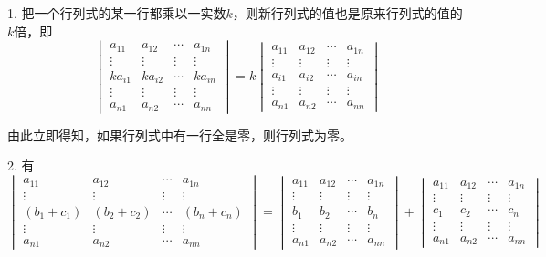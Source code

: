   1. 把一个行列式的某一行都乘以一实数$k$，则新行列式的值也是原来行列式的值的$k$倍，即
\[
  \begin{vmatrix}
    a_{11} & a_{12} & \cdots & a_{1n} \\
    \vdots & \vdots & \vdots & \vdots \\
    ka_{i1} & ka_{i2} & \cdots & ka_{in} \\
    \vdots & \vdots & \vdots & \vdots \\
    a_{n1} & a_{n2} & \cdots & a_{nn}
  \end{vmatrix}
  = k
  \begin{vmatrix}
    a_{11} & a_{12} & \cdots & a_{1n} \\
    \vdots & \vdots & \vdots & \vdots \\
    a_{i1} & a_{i2} & \cdots & a_{in} \\
    \vdots & \vdots & \vdots & \vdots \\
    a_{n1} & a_{n2} & \cdots & a_{nn}
  \end{vmatrix}
  \]

  由此立即得知，如果行列式中有一行全是零，则行列式为零。

  2. 有
  \[
  \begin{vmatrix}
    a_{11} & a_{12} & \cdots & a_{1n} \\
    \vdots & \vdots & \vdots & \vdots \\
    (b_1+c_1) & (b_2+c_2) & \cdots & (b_n+c_n) \\
    \vdots & \vdots & \vdots & \vdots \\
    a_{n1} & a_{n2} & \cdots & a_{nn}
  \end{vmatrix}
  =
  \begin{vmatrix}
    a_{11} & a_{12} & \cdots & a_{1n} \\
    \vdots & \vdots & \vdots & \vdots \\
    b_1 & b_2 & \cdots & b_n \\
    \vdots & \vdots & \vdots & \vdots \\
    a_{n1} & a_{n2} & \cdots & a_{nn}
  \end{vmatrix}
  +
  \begin{vmatrix}
    a_{11} & a_{12} & \cdots & a_{1n} \\
    \vdots & \vdots & \vdots & \vdots \\
    c_1 & c_2 & \cdots & c_n \\
    \vdots & \vdots & \vdots & \vdots \\
    a_{n1} & a_{n2} & \cdots & a_{nn}
  \end{vmatrix}
  \]

